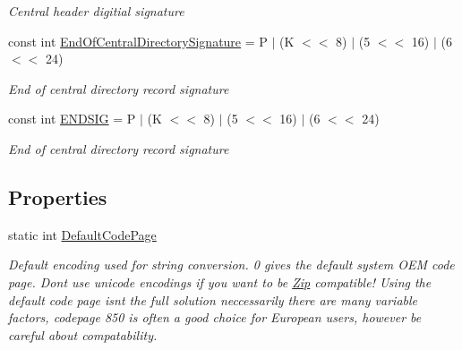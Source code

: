 \begin{DoxyCompactItemize}
\begin{DoxyCompactList}\small\item\em Central header digitial signature \end{DoxyCompactList}\item 
const int \hyperlink{class_i_c_sharp_code_1_1_sharp_zip_lib_1_1_zip_1_1_zip_constants_a10d861157bd8ea4510f2e7b0b01fa80c}{End\+Of\+Central\+Directory\+Signature} = \textquotesingle{}P\textquotesingle{} $\vert$ (\textquotesingle{}K\textquotesingle{} $<$$<$ 8) $\vert$ (5 $<$$<$ 16) $\vert$ (6 $<$$<$ 24)
\begin{DoxyCompactList}\small\item\em End of central directory record signature \end{DoxyCompactList}\item 
const int \hyperlink{class_i_c_sharp_code_1_1_sharp_zip_lib_1_1_zip_1_1_zip_constants_a5903e34af168b1761ca6127fda137ae2}{E\+N\+D\+S\+IG} = \textquotesingle{}P\textquotesingle{} $\vert$ (\textquotesingle{}K\textquotesingle{} $<$$<$ 8) $\vert$ (5 $<$$<$ 16) $\vert$ (6 $<$$<$ 24)
\begin{DoxyCompactList}\small\item\em End of central directory record signature \end{DoxyCompactList}\end{DoxyCompactItemize}
\subsection*{Properties}
\begin{DoxyCompactItemize}
\item 
static int \hyperlink{class_i_c_sharp_code_1_1_sharp_zip_lib_1_1_zip_1_1_zip_constants_a57f0c50829b7a253be7773e189e72944}{Default\+Code\+Page}
\begin{DoxyCompactList}\small\item\em Default encoding used for string conversion. 0 gives the default system O\+EM code page. Dont use unicode encodings if you want to be \hyperlink{namespace_i_c_sharp_code_1_1_sharp_zip_lib_1_1_zip}{Zip} compatible! Using the default code page isnt the full solution neccessarily there are many variable factors, codepage 850 is often a good choice for European users, however be careful about compatability. \end{DoxyCompactList}\end{DoxyCompactItemize}


